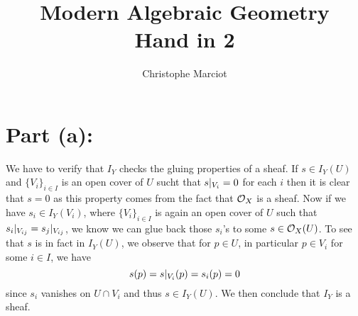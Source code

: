 \documentclass[11pt, a4paper, twoside]{article}
\begin{document}
\title{Modern Algebraic Geometry\\ Hand in 2}
\author{Christophe Marciot}
\maketitle

\section*{Part (a):}
We have to verify that $I_Y$ checks the gluing properties of a sheaf. If $s\in I_Y(U)$ and $\{V_i\}_{i\in I}$ is an open cover of $U$ sucht that $s|_{V_i}=0$ for each $i$ then it is clear that $s=0$ as this property comes from the fact that $\mathcal{O}_X$ is a sheaf. Now if we have $s_i\in I_Y(V_i)$, where $\{V_i\}_{i\in I}$ is again an open cover of $U$ such that $s_i|_{V_{ij}}=s_j|_{V_{ij}}$, we know we can glue back those $s_i$'s to some $s\in\mathcal{O}_X(U)$. To see that $s$ is in fact in $I_Y(U)$, we observe that for $p\in U$, in particular $p\in V_i$ for some $i\in I$, we have 
\begin{displaymath}
	s(p)=s|_{V_i}(p)=s_i(p)=0
\end{displaymath} 
since $s_i$ vanishes on $U\cap V_i$ and thus $s\in I_Y(U)$. We then conclude that $I_Y$ is a sheaf.
\end{document}
